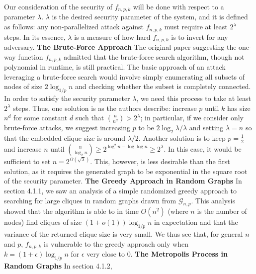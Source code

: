\documentclass{article}
\theoremstyle{definition}
\begin{document}
Our consideration of the security of $f_{n,p,k}$ will be done with respect to a 
parameter $\lambda$.  $\lambda$ is the desired security parameter of the system, 
and it is defined as follows: any non-parallelized attack against $f_{n,p,k}$ must
require at least $2^\lambda$ steps.  In its essence, $\lambda$ is a measure 
of how hard $f_{n,p,k}$ is to invert for any adversary.
\newline\newline
\noindent \textbf{The Brute-Force Approach } The original paper suggesting the
one-way function $f_{n,p,k}$ admitted that the brute-force search algorithm,
though not polynomial in runtime, is still practical.  The basic approach 
of an attack leveraging a brute-force search would involve simply enumerating
all subsets of nodes of size $2\log_{1/p}{n}$ and checking whether the subset 
is completely connected.  In order to satisfy the security parameter 
$\lambda$, we need this process to take at least $2^\lambda$ steps.
Thus, one solution is as the authors describe: increase $p$ until 
$k$ has size $n^d$ for some constant $d$ such that 
$\binom{n}{n^d} > 2^\lambda$; in particular, if we consider only brute-force attacks,
we suggest increasing 
$p$ to be $2\log_2{\lambda}/\lambda$ and setting $\lambda=n$ so that the embedded clique size is 
around $\lambda/2$.  Another solution is to keep $p=\frac{1}{2}$ 
and increase $n$ until $\binom{n}{\log_2{n}} \geq 2^{\log^2{n}-\log{\log{n}}} 
\geq 2^\lambda$.  In this case, it would be sufficient to set $n = 2^{\Omega(\sqrt{\lambda})}$.
This, however, is less desirable than the first solution, as it requires the generated graph to 
be exponential in the square root of the security parameter.
\newline\newline
\noindent \textbf{The Greedy Approach in Random Graphs } In section 4.1.1, 
we saw an analysis of a simple randomized greedy approach to searching 
for large cliques in random graphs drawn from $\mathcal{G}_{n,p}$.  This 
analysis showed that the algorithm is able to in time $O(n^2)$ (where $n$ is 
the number of nodes) find cliques of size $(1+o(1)) \log_{1/p} n$ in expectation 
and that the variance of the returned clique size is very small.  We thus see 
that, for general $n$ and $p$, $f_{n,p,k}$ is vulnerable to the greedy approach
only when $k=(1+\epsilon)\log_{1/p}{n}$ for $\epsilon$ very close to 0.
\newline\newline
\noindent \textbf{The Metropolis Process in Random Graphs} In section 4.1.2,
\end{document}

